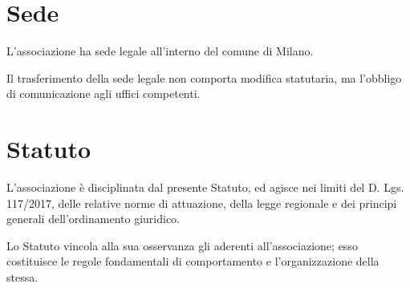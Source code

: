\documentclass[legalpaper, 11pt]{exam}
\let\tempone\enumerate
\let\temptwo\endenumerate
\renewenvironment{enumerate}{\tempone\addtolength{\itemsep}{-0.45\baselineskip}}{\temptwo}
\begin{document}
{\section{Sede}
\begin{enumerate}
 \item L’associazione ha sede legale all’interno del comune di Milano.
 \item Il trasferimento della sede legale non comporta modifica statutaria, ma l’obbligo di comunicazione agli uffici competenti.
\end{enumerate}

\section{Statuto}
\begin{enumerate}
 \item L’associazione è disciplinata dal presente Statuto, ed agisce nei limiti del D. Lgs. 117/2017, delle relative norme di attuazione, della legge regionale e dei principi generali dell’ordinamento giuridico.
 \item Lo Statuto vincola alla sua osservanza gli aderenti all’associazione; esso costituisce le regole fondamentali di comportamento e l’organizzazione della stessa.
\end{enumerate}

}
\end{document}
